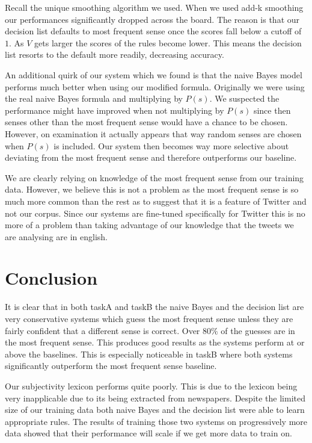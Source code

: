 \documentclass[11pt]{article}
\begin{document}
Recall the unique smoothing algorithm we used. When we used add-k smoothing our performances significantly dropped across the board. The reason is that our decision list defaults to most frequent sense once the scores fall below a cutoff of $1$. As $V$ gets larger the scores of the rules become lower. This means the decision list resorts to the default more readily, decreasing accuracy. 

An additional quirk of our system which we found is that the naive Bayes model performs much better when using our modified formula. Originally we were using the real naive Bayes formula and multiplying by $P(s)$. We suspected the performance might have improved when not multiplying by $P(s)$ since then senses other than the most frequent sense would have a chance to be chosen. However, on examination it actually appears that way random senses are chosen when $P(s)$ is included. Our system then becomes way more selective about deviating from the most frequent sense and therefore outperforms our baseline.

We are clearly relying on knowledge of the most frequent sense from our training data. However, we believe this is not a problem as the most frequent sense is so much more common than the rest as to suggest that it is a feature of Twitter and not our corpus. Since our systems are fine-tuned specifically for Twitter this is no more of a problem than taking advantage of our knowledge that the tweets we are analysing are in english.


\section{Conclusion}
It is clear that in both taskA and taskB the naive Bayes and the decision list are very conservative systems which guess the most frequent sense unless they are fairly confident that a different sense is correct. Over $80\%$ of the guesses are in the most frequent sense. This produces good results as the systems perform at or above the baselines. This is especially noticeable in taskB where both systems significantly outperform the most frequent sense baseline. 

Our subjectivity lexicon performs quite poorly. This is due to the lexicon being very inapplicable due to its being extracted from newspapers. Despite the limited size of our training data both naive Bayes and the decision list were able to learn appropriate rules. The results of training those two systems on progressively more data showed that their performance will scale if we get more data to train on. 
\end{document}
